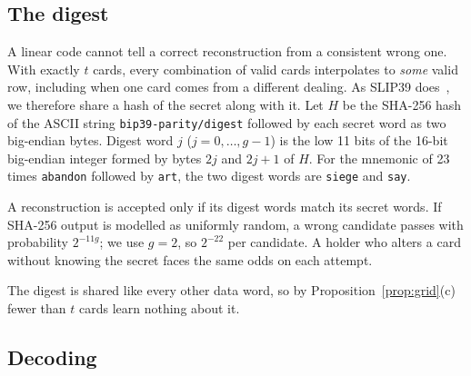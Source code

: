 \documentclass[numeric]{anvil-paper}
\newcommand{\code}[1]{\texttt{#1}}
\begin{document}
\subsection{The digest}
\label{sec:digest}

A linear code cannot tell a correct reconstruction from a consistent wrong one.
With exactly $t$ cards, every combination of valid cards interpolates to
\emph{some} valid row, including when one card comes from a different dealing.
As SLIP39 does~\citep{slip39}, we therefore share a hash of the secret along
with it. Let $H$ be the SHA-256 hash of the ASCII string
\code{bip39-parity/digest} followed by each secret word as two big-endian
bytes. Digest word $j$ ($j=0,\dots,g-1$) is the low 11 bits of the 16-bit
big-endian integer formed by bytes $2j$ and $2j+1$ of $H$. For the mnemonic of
23 times \code{abandon} followed by \code{art}, the two digest words are
\code{siege} and \code{say}.

A reconstruction is accepted only if its digest words match its secret words.
If SHA-256 output is modelled as uniformly random, a wrong candidate passes
with probability $2^{-11g}$; we use $g=2$, so $2^{-22}$ per candidate. A holder
who alters a card without knowing the secret faces the same odds on each
attempt.

The digest is shared like every other data word, so by
Proposition~\ref{prop:grid}(c) fewer than $t$ cards learn nothing about it.

\subsection{Decoding}
\label{sec:decoder}
\end{document}
